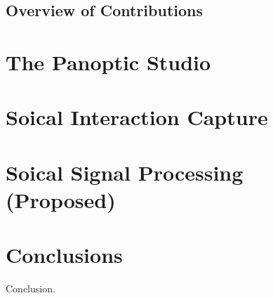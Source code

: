 \documentclass[oneside,letterpaper]{memoir}
\begin{document}
\section{Overview of Contributions}

\chapter{The Panoptic Studio}

\chapter{Soical Interaction Capture}

\chapter{Soical Signal Processing (Proposed)}

\chapter{Conclusions}
Conclusion.

\backmatter
\end{document}
